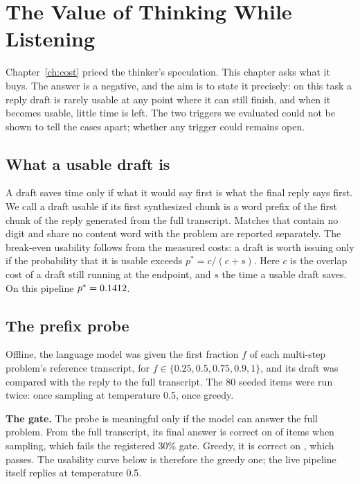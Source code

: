 \chapter{The Value of Thinking While Listening}
\label{ch:value}

Chapter~\ref{ch:cost} priced the thinker's speculation. This chapter asks what
it buys. The answer is a negative, and the aim is to state it precisely: on
this task a reply draft is rarely usable at any point where it can still
finish, and when it becomes usable, little time is left. The two triggers we
evaluated could not be shown to tell the cases apart; whether any trigger
could remains open.

\section{What a usable draft is}
\label{sec:usable}

A draft saves time only if what it would say first is what the final reply
says first. We call a draft usable if its first synthesized chunk is a word
prefix of the first chunk of the reply generated from the full transcript.
Matches that contain no digit and share no content word with the problem are
reported separately. The break-even usability follows from the measured costs: a draft
is worth issuing only if the probability that it is usable exceeds
$p^\ast = c / (c + s)$. Here $c$ is the overlap cost of a draft still running
at the endpoint, and $s$ the time a usable draft saves. On this pipeline
$p^\ast = 0.1412$.

\section{The prefix probe}
\label{sec:probe}

Offline, the language model was given the first fraction $f$ of each
multi-step problem's reference transcript, for $f \in \{0.25, 0.5, 0.75, 0.9,
1\}$, and its draft was compared with the reply to the full transcript. The 80
seeded items were run twice: once sampling at temperature 0.5, once greedy.

\textbf{The gate.} The probe is meaningful only if the model can answer the
full problem. From the full transcript, its final answer is correct on
\SampledGate{} of items when sampling, which fails the registered 30\% gate.
Greedy, it is correct on \GreedyGate, which passes. The usability curve below
is therefore the greedy one; the live pipeline itself replies at temperature
0.5.


